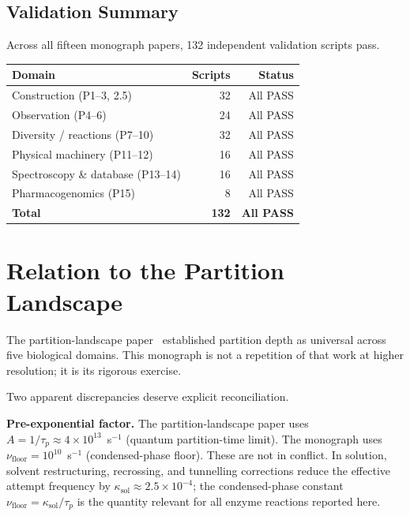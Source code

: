 \documentclass[11pt,twocolumn,a4paper]{article}
\theoremstyle{definition}
\theoremstyle{remark}
\newcommand{\nufloor}{\nu_{\mathrm{floor}}}
\begin{document}
\subsection{Validation Summary}

Across all fifteen monograph papers, 132 independent validation scripts pass.

\begin{center}
\begin{tabular}{lrr}
\toprule
Domain & Scripts & Status \\
\midrule
Construction (P1--3, 2.5) & 32 & All PASS \\
Observation (P4--6)        & 24 & All PASS \\
Diversity / reactions (P7--10) & 32 & All PASS \\
Physical machinery (P11--12) & 16 & All PASS \\
Spectroscopy \& database (P13--14) & 16 & All PASS \\
Pharmacogenomics (P15) & 8  & All PASS \\
\midrule
\textbf{Total} & \textbf{132} & \textbf{All PASS} \\
\bottomrule
\end{tabular}
\end{center}

\section{Relation to the Partition Landscape}
\label{sec:bpl}

The partition-landscape paper~\citep{sachikonye2025_bpl} established partition
depth as universal across five biological domains.  This monograph is not a
repetition of that work at higher resolution; it is its rigorous exercise.

Two apparent discrepancies deserve explicit reconciliation.

\textbf{Pre-exponential factor.}  The partition-landscape paper uses
$A = 1/\tau_p \approx 4\times10^{13}$~s$^{-1}$ (quantum partition-time
limit).  The monograph uses $\nufloor = 10^{10}$~s$^{-1}$ (condensed-phase
floor).  These are not in conflict.  In solution, solvent restructuring,
recrossing, and tunnelling corrections reduce the effective attempt frequency
by $\kappa_{\mathrm{sol}} \approx 2.5\times10^{-4}$; the condensed-phase
constant $\nufloor = \kappa_{\mathrm{sol}}/\tau_p$ is the quantity relevant
for all enzyme reactions reported here.
\end{document}

